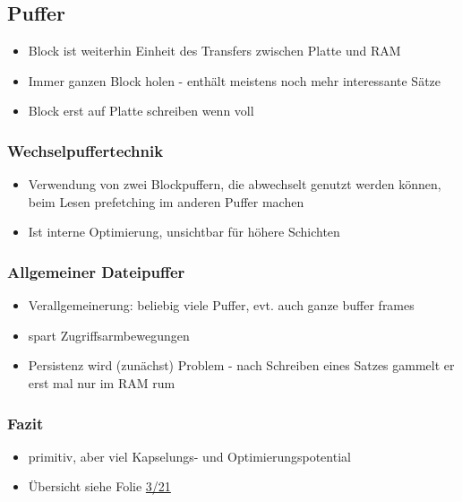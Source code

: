 \documentclass[a4paper, 12pt]{scrartcl}
\begin{document}
\subsection{Puffer}
\begin{itemize}
	\item
		Block ist weiterhin Einheit des Transfers zwischen  Platte und RAM
	\item
		Immer ganzen Block holen - enthält meistens noch mehr interessante Sätze
	\item
		Block erst auf Platte schreiben wenn voll
\end{itemize}
\subsubsection{Wechselpuffertechnik}
\begin{itemize}
	\item Verwendung von zwei Blockpuffern, die abwechselt genutzt werden können, beim Lesen prefetching im anderen Puffer machen
	\item
		Ist interne Optimierung, unsichtbar für höhere Schichten
\end{itemize}

\subsubsection{Allgemeiner Dateipuffer}
\begin{itemize}
	\item
		Verallgemeinerung: beliebig viele Puffer, evt. auch ganze buffer frames
	\item
		spart Zugriffsarmbewegungen
	\item
		Persistenz wird (zunächst) Problem - nach Schreiben eines Satzes gammelt er erst mal nur im RAM rum
\end{itemize}
\subsubsection{Fazit}
\begin{itemize}
	\item
		primitiv, aber viel Kapselungs- und Optimierungspotential
	\item Übersicht siehe Folie \href{run:IDB-2015WS-03-Saetze.pdf}{3/21}
\end{itemize}
\end{document}

